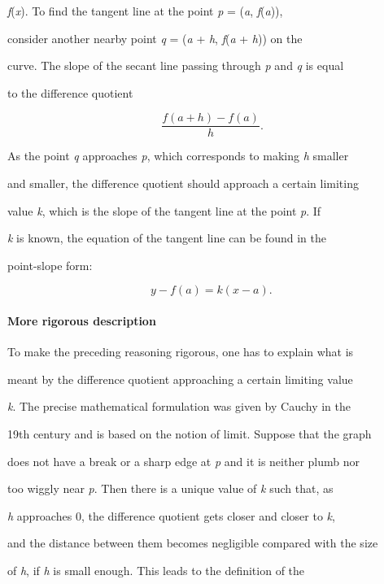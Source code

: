 \textit{f}(\textit{x}). To find the tangent line at the point \textit{p} = (\textit{a}, \textit{f}(\textit{a})),

consider another nearby point \textit{q} = (\textit{a} + \textit{h}, \textit{f}(\textit{a} + \textit{h})) on the

curve. The slope of the secant line passing through \textit{p} and \textit{q} is equal

to the difference quotient



$$\frac{f(a+h)-f(a)}{h}.$$



As the point \textit{q} approaches \textit{p}, which corresponds to making \textit{h} smaller

and smaller, the difference quotient should approach a certain limiting

value \textit{k}, which is the slope of the tangent line at the point \textit{p}. If

\textit{k} is known, the equation of the tangent line can be found in the

point-slope form:



$$y-f(a) = k(x-a).\,$$



\paragraph{More rigorous description}



To make the preceding reasoning rigorous, one has to explain what is

meant by the difference quotient approaching a certain limiting value

\textit{k}. The precise mathematical formulation was given by Cauchy in the

19th century and is based on the notion of limit. Suppose that the graph

does not have a break or a sharp edge at \textit{p} and it is neither plumb nor

too wiggly near \textit{p}. Then there is a unique value of \textit{k} such that, as

\textit{h} approaches 0, the difference quotient gets closer and closer to \textit{k},

and the distance between them becomes negligible compared with the size

of \textit{h}, if \textit{h} is small enough. This leads to the definition of the

